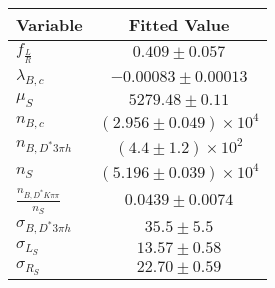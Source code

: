\begin{tabular}[t]{lc}
\hline
Variable &Fitted Value\\
\hline\hline
$f_{\frac{L}{R}}$&$0.409\pm0.057$\\
\hline
$\lambda_{B,c}$&$-0.00083\pm0.00013$\\
\hline
$\mu_S$&$5279.48\pm0.11$\\
\hline
$n_{B,c}$&$(2.956\pm0.049)\times 10^4$\\
\hline
$n_{B,D^*3\pi h}$&$(4.4\pm1.2)\times 10^2$\\
\hline
$n_S$&$(5.196\pm0.039)\times 10^4$\\
\hline
$\frac{n_{B,D^*K\pi\pi}}{n_S}$&$0.0439\pm0.0074$\\
\hline
$\sigma_{B,D^*3\pi h}$&$35.5\pm5.5$\\
\hline
$\sigma_{L_S}$&$13.57\pm0.58$\\
\hline
$\sigma_{R_S}$&$22.70\pm0.59$\\
\hline
\end{tabular}